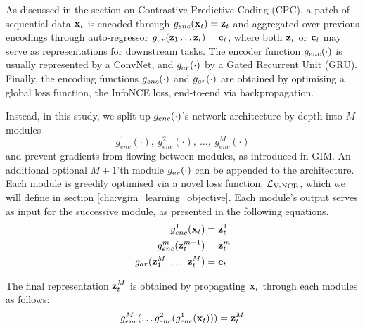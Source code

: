 		As discussed in the section on Contrastive Predictive Coding (CPC), a patch of sequential data $\mathbf{x}_t$ is encoded through $g_{enc}(\mathbf{x}_t) = \mathbf{z}_t$ and aggregated over previous encodings through auto-regressor $g_{ar}(\mathbf{z}_1  \dots \mathbf{z}_t) = \mathbf{c}_t$, where both $\mathbf{z}_t$ or $\mathbf{c}_t$ may serve as representations for downstream tasks. The encoder function $g_{enc}(\cdot)$ is usually represented by a ConvNet, and $g_{ar}(\cdot)$ by a Gated Recurrent Unit (GRU).
		Finally, the encoding functions $g_{enc}(\cdot)$ and $g_{ar}(\cdot)$ are obtained by optimising a global loss function, the InfoNCE loss, end-to-end via backpropagation. 

			Instead, in this study, we split up $g_{enc}(\cdot)$'s network architecture by depth into $M$ modules 
			$$g_{enc}^1(\cdot),~ g_{enc}^2(\cdot),~\dots,~g_{enc}^M(\cdot)$$ 
			and prevent gradients from flowing between modules, as introduced in GIM. An additional optional $M \! + \! 1$'th module $g_{ar}(\cdot)$ can be appended to the architecture. Each module is greedily optimised via a novel loss function, $\mathcal{L}_{\text{V-NCE}}$, which we will define in section \ref{cha:vgim_learning_objective}. Each module's output serves as input for the successive module, as presented in the following equations. %
			\begin{align*} %
				g_{enc}^1(\xt) &= \zt^1 \\
				g_{enc}^m(\zt^{m-1}) &= \zt^m \\
				g_{ar}(\z_1^M ~ \dots ~ \zt^M) &= \ct
			\end{align*}
			
			The final representation $\mathbf{z}_t^M$ is obtained by propagating $\mathbf{x}_t$ through each modules as follows:
			$$ g_{enc}^M ( \dots	g_{enc}^2(g_{enc}^1(\mathbf{x}_t))) = \mathbf{z}_t^M$$
			
			
			
					
